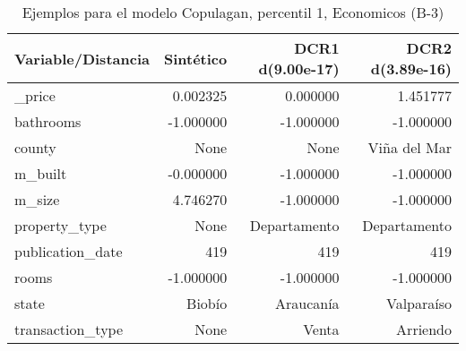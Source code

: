 \begin{table}[H]
\centering
\fontsize{10}{14}\selectfont
\caption{Ejemplos para el modelo Copulagan, percentil 1, Economicos (B-3)}
\label{table-example-economicos-b-3-copulagan-1p}
\begin{tabular}{|l|r|r|r|}
\hline
\rowcolor[gray]{0.8}
Variable/Distancia & Sintético & DCR1 d(9.00e-17) & DCR2 d(3.89e-16) \\
\hline \_price & \cellcolor[rgb]{0.9, 0.54, 0.52} 0.002325 & \cellcolor[rgb]{0.9, 0.54, 0.52} 0.000000 & 1.451777 \\
\hline bathrooms & \cellcolor[rgb]{0.9, 0.54, 0.52} -1.000000 & \cellcolor[rgb]{0.9, 0.54, 0.52} -1.000000 & \cellcolor[rgb]{0.9, 0.54, 0.52} -1.000000 \\
\hline county & \cellcolor[rgb]{0.9, 0.54, 0.52} None & \cellcolor[rgb]{0.9, 0.54, 0.52} None & Viña del Mar \\
\hline m\_built & \cellcolor[rgb]{0.9, 0.54, 0.52} -0.000000 & \cellcolor[rgb]{0.9, 0.54, 0.52} -1.000000 & \cellcolor[rgb]{0.9, 0.54, 0.52} -1.000000 \\
\hline m\_size & \cellcolor[rgb]{0.9, 0.54, 0.52} 4.746270 & -1.000000 & -1.000000 \\
\hline property\_type & \cellcolor[rgb]{0.9, 0.54, 0.52} None & Departamento & Departamento \\
\hline publication\_date & \cellcolor[rgb]{0.9, 0.54, 0.52} 419 & \cellcolor[rgb]{0.9, 0.54, 0.52} 419 & \cellcolor[rgb]{0.9, 0.54, 0.52} 419 \\
\hline rooms & \cellcolor[rgb]{0.9, 0.54, 0.52} -1.000000 & \cellcolor[rgb]{0.9, 0.54, 0.52} -1.000000 & \cellcolor[rgb]{0.9, 0.54, 0.52} -1.000000 \\
\hline state & \cellcolor[rgb]{0.9, 0.54, 0.52} Biobío & Araucanía & Valparaíso \\
\hline transaction\_type & \cellcolor[rgb]{0.9, 0.54, 0.52} None & Venta & Arriendo \\
\hline
\end{tabular}
\end{table}
